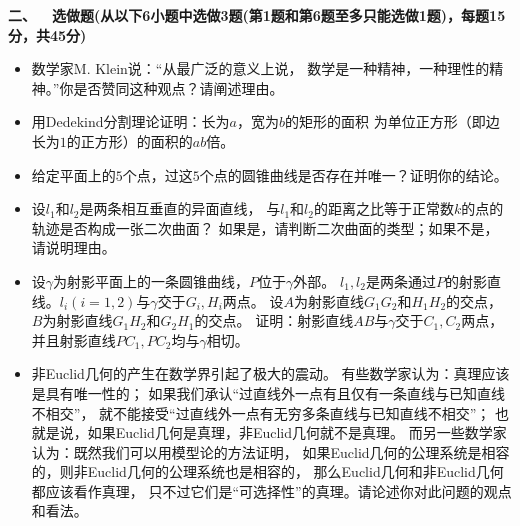 \textbf{二、\ \ 选做题(从以下6小题中选做3题(第1题和第6题至多只能选做1题)，每题15分，共45分)}
\begin{itemize}
    \item[1.] 数学家M. Klein说：``从最广泛的意义上说，
    数学是一种精神，一种理性的精神。''你是否赞同这种观点？请阐述理由。
    \item[2.] 用Dedekind分割理论证明：长为$a$，宽为$b$的矩形的面积
    为单位正方形（即边长为$1$的正方形）的面积的$ab$倍。
    \item[3.] 给定平面上的$5$个点，过这$5$个点的圆锥曲线是否存在并唯一？证明你的结论。
    \item[4.] 设$l_1$和$l_2$是两条相互垂直的异面直线，
    与$l_1$和$l_2$的距离之比等于正常数$k$的点的轨迹是否构成一张二次曲面？
    如果是，请判断二次曲面的类型；如果不是，请说明理由。
    \item[5.] 设$\gamma$为射影平面上的一条圆锥曲线，$P$位于$\gamma$外部。
    $l_1,l_2$是两条通过$P$的射影直线。$l_i(i=1,2)$与$\gamma$交于$G_i,H_i$两点。
    设$A$为射影直线$G_1G_2$和$H_1H_2$的交点，$B$为射影直线$G_1H_2$和$G_2H_1$的交点。
    证明：射影直线$AB$与$\gamma$交于$C_1,C_2$两点，
    并且射影直线$PC_1,PC_2$均与$\gamma$相切。
    \item[6.] 非Euclid几何的产生在数学界引起了极大的震动。
    有些数学家认为：真理应该是具有唯一性的；
    如果我们承认``过直线外一点有且仅有一条直线与已知直线不相交''，
    就不能接受``过直线外一点有无穷多条直线与已知直线不相交''；
    也就是说，如果Euclid几何是真理，非Euclid几何就不是真理。
    而另一些数学家认为：既然我们可以用模型论的方法证明，
    如果Euclid几何的公理系统是相容的，则非Euclid几何的公理系统也是相容的，
    那么Euclid几何和非Euclid几何都应该看作真理，
    只不过它们是``可选择性''的真理。请论述你对此问题的观点和看法。
\end{itemize}